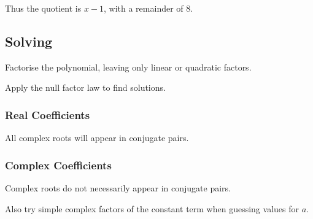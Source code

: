 \documentclass[a4paper,11pt]{article}
\begin{document}
Thus the quotient is $x - 1$, with a remainder of $8$.


\subsection{Solving}

Factorise the polynomial, leaving only linear or quadratic factors.

Apply the null factor law to find solutions.


\subsubsection{Real Coefficients}

All complex roots will appear in conjugate pairs.


\subsubsection{Complex Coefficients}

Complex roots do not necessarily appear in conjugate pairs.

Also try simple complex factors of the constant term when guessing values for
$a$.
\end{document}
